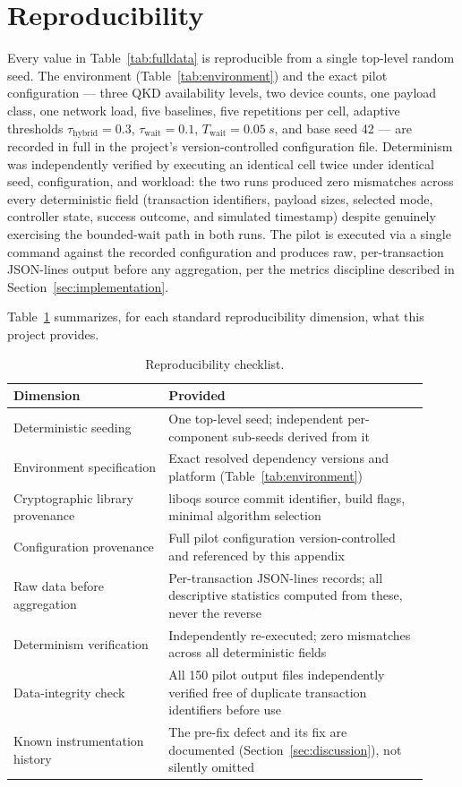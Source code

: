 \documentclass[journal]{IEEEtran}
\begin{document}
\section{Reproducibility}
\label{app:repro}

Every value in Table~\ref{tab:fulldata} is reproducible from a single top-level random seed. The environment (Table~\ref{tab:environment}) and the exact pilot configuration --- three QKD availability levels, two device counts, one payload class, one network load, five baselines, five repetitions per cell, adaptive thresholds $\tau_{\text{hybrid}}=0.3$, $\tau_{\text{wait}}=0.1$, $T_{\text{wait}}=\qty{0.05}{s}$, and base seed 42 --- are recorded in full in the project's version-controlled configuration file. Determinism was independently verified by executing an identical cell twice under identical seed, configuration, and workload: the two runs produced zero mismatches across every deterministic field (transaction identifiers, payload sizes, selected mode, controller state, success outcome, and simulated timestamp) despite genuinely exercising the bounded-wait path in both runs. The pilot is executed via a single command against the recorded configuration and produces raw, per-transaction JSON-lines output before any aggregation, per the metrics discipline described in Section~\ref{sec:implementation}.

Table~\ref{tab:reprochecklist} summarizes, for each standard reproducibility dimension, what this project provides.

\begin{table}[h]
\centering
\caption{Reproducibility checklist.}
\label{tab:reprochecklist}
\small
\begin{tabular}{@{}p{0.34\linewidth}p{0.58\linewidth}@{}}
\toprule
Dimension & Provided \\
\midrule
Deterministic seeding & One top-level seed; independent per-component sub-seeds derived from it \\
Environment specification & Exact resolved dependency versions and platform (Table~\ref{tab:environment}) \\
Cryptographic library provenance & liboqs source commit identifier, build flags, minimal algorithm selection \\
Configuration provenance & Full pilot configuration version-controlled and referenced by this appendix \\
Raw data before aggregation & Per-transaction JSON-lines records; all descriptive statistics computed from these, never the reverse \\
Determinism verification & Independently re-executed; zero mismatches across all deterministic fields \\
Data-integrity check & All 150 pilot output files independently verified free of duplicate transaction identifiers before use \\
Known instrumentation history & The pre-fix defect and its fix are documented (Section~\ref{sec:discussion}), not silently omitted \\
\bottomrule
\end{tabular}
\end{table}
\end{document}
